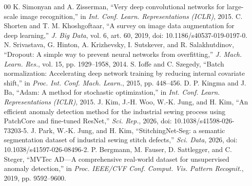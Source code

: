 \documentclass[conference,a4paper]{IEEEtran}
\begin{document}
\begin{thebibliography}{00}
 K. Simonyan and A. Zisserman, ``Very deep convolutional networks for large-scale image recognition,'' in \emph{Int. Conf. Learn. Representations (ICLR)}, 2015.
 C. Shorten and T. M. Khoshgoftaar, ``A survey on image data augmentation for deep learning,'' \emph{J. Big Data}, vol. 6, art. 60, 2019, doi: 10.1186/s40537-019-0197-0.
 N. Srivastava, G. Hinton, A. Krizhevsky, I. Sutskever, and R. Salakhutdinov, ``Dropout: A simple way to prevent neural networks from overfitting,'' \emph{J. Mach. Learn. Res.}, vol. 15, pp. 1929--1958, 2014.
 S. Ioffe and C. Szegedy, ``Batch normalization: Accelerating deep network training by reducing internal covariate shift,'' in \emph{Proc. Int. Conf. Mach. Learn.}, 2015, pp. 448--456.
 D. P. Kingma and J. Ba, ``Adam: A method for stochastic optimization,'' in \emph{Int. Conf. Learn. Representations (ICLR)}, 2015.
 J. Kim, J.-H. Woo, W.-K. Jung, and H. Kim, ``An efficient anomaly detection method for the industrial sewing process using PatchCore and fine-tuned ResNet,'' \emph{Sci. Rep.}, 2026, doi: 10.1038/s41598-026-73203-5.
 J. Park, W.-K. Jung, and H. Kim, ``StitchingNet-Seg: a semantic segmentation dataset of industrial sewing stitch defects,'' \emph{Sci. Data}, 2026, doi: 10.1038/s41597-026-08496-2.
 P. Bergmann, M. Fauser, D. Sattlegger, and C. Steger, ``MVTec AD---A comprehensive real-world dataset for unsupervised anomaly detection,'' in \emph{Proc. IEEE/CVF Conf. Comput. Vis. Pattern Recognit.}, 2019, pp. 9592--9600.
\end{thebibliography}
\end{document}
